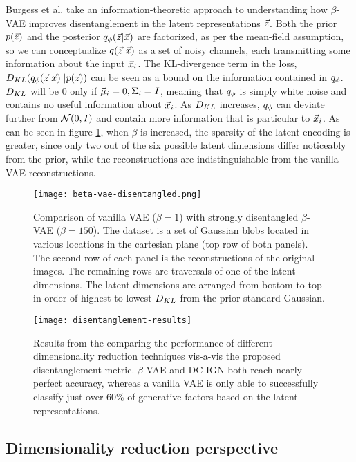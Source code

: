 Burgess et al. \cite{burgess2018understanding} take an information-theoretic approach to understanding how $\beta$-VAE improves disentanglement in the latent representations $\vec{z}$. Both the prior $p(\vec{z})$ and the posterior $q_\phi(\vec{z}|\vec{x})$ are factorized, as per the mean-field assumption, so we can conceptualize $q(\vec{z}|\vec{x})$ as a set of noisy channels, each transmitting some information about the input $\vec{x}_i$. The KL-divergence term in the loss, $D_{KL}(q_\phi(\vec{z}|\vec{x})||p(\vec{z}))$ can be seen as a bound on the information contained in $q_\phi$. $D_{KL}$ will be 0 only if $\vec{\mu}_i = 0, \Sigma_i = I$, meaning that $q_\phi$ is simply white noise and contains no useful information about $\vec{x}_i$. As $D_{KL}$ increases, $q_\phi$ can deviate further from $\mathcal{N}(0, I)$ and contain more information that is particular to $\vec{x}_i$. As can be seen in figure \ref{fig:beta-vae-disentagled}, when $\beta$ is increased, the sparsity of the latent encoding is greater, since only two out of the six possible latent dimensions differ noticeably from the prior, while the reconstructions are indistinguishable from the vanilla VAE reconstructions.

\begin{figure}
    \centering
    \texttt{[image: beta-vae-disentangled.png]}
    \caption{Comparison of vanilla VAE ($\beta=1$) with strongly disentangled $\beta$-VAE ($\beta=150$). The dataset is a set of Gaussian blobs located in various locations in the cartesian plane (top row of both panels). The second row of each panel is the reconstructions of the original images. The remaining rows are traversals of one of the latent dimensions. The latent dimensions are arranged from bottom to top in order of highest to lowest $D_{KL}$ from the prior standard Gaussian.}
    \label{fig:beta-vae-disentagled}
\end{figure}

\begin{figure}
    \centering
    \texttt{[image: disentanglement-results]}
    \caption{Results from the \cite{higgins2016beta} comparing the performance of different dimensionality reduction techniques vis-a-vis the proposed disentanglement metric. $\beta$-VAE and DC-IGN both reach nearly perfect accuracy, whereas a vanilla VAE is only able to successfully classify just over 60\% of generative factors based on the latent representations.}
    \label{fig:disentanglement-results}
\end{figure}

\subsection{Dimensionality reduction perspective}

